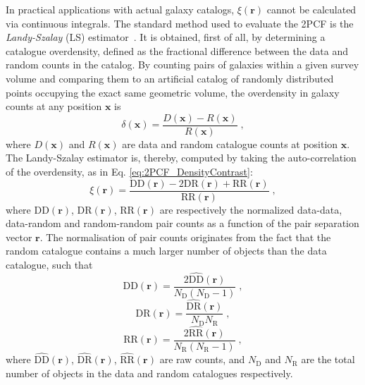 \documentclass[12pt,a4paper,oneside]{report}
\begin{document}
In practical applications with actual galaxy catalogs, $\xi(\mathbf{r})$ cannot be calculated via continuous integrals. The standard method used to evaluate the 2PCF is the \textit{Landy-Szalay} (LS) estimator~\cite{LSEstimator}. It is obtained, first of all, by determining a catalogue overdensity, defined as the fractional difference between the data and random counts in the catalog. By counting pairs of galaxies within a given survey volume and comparing them to an artificial catalog of randomly distributed points occupying the exact same geometric volume, the overdensity in galaxy counts at any position $\mathbf{x}$ is
\begin{equation}
  \delta (\mathbf{x}) = \frac{D(\mathbf{x}) - R(\mathbf{x})}{R(\mathbf{x})} \; ,
  \label{eq:LS_DensityContrast}
\end{equation}
where $D(\mathbf{x})$ and $R(\mathbf{x})$ are data and random catalogue counts at position $\mathbf{x}$. 
The Landy-Szalay estimator is, thereby, computed by taking the auto-correlation of the overdensity, as in Eq. \eqref{eq:2PCF_DensityContrast}:
\begin{equation}
  \xi (\mathbf{r}) = \frac{\mathrm{DD}(\mathbf{r}) - 2\mathrm{DR}(\mathbf{r}) + \mathrm{RR}(\mathbf{r})}{\mathrm{RR}(\mathbf{r})} \; , 
  \label{eq:LSEstimator}
\end{equation}
where $\mathrm{DD}(\mathbf{r})$, $\mathrm{DR}(\mathbf{r})$, $\mathrm{RR}(\mathbf{r})$ are respectively the normalized data-data, data-random and random-random pair counts as a function of the pair separation vector $\mathbf{r}$. The normalisation of pair counts originates from the fact that the random catalogue contains a much larger number of objects than the data catalogue, such that
\begin{equation}
  \mathrm{DD}(\mathbf{r}) = \frac{2 \widehat{\mathrm{DD}}(\mathbf{r})}{N_\mathrm{D} (N_\mathrm{D}-1)} \; ,
  \label{eq:DD}
\end{equation}
\begin{equation}
  \mathrm{DR}(\mathbf{r}) = \frac{\widehat{\mathrm{DR}}(\mathbf{r})}{N_\mathrm{D} N_\mathrm{R}} \; ,
  \label{eq:DR}
\end{equation}
\begin{equation}
  \mathrm{RR}(\mathbf{r}) = \frac{2 \widehat{\mathrm{RR}}(\mathbf{r})}{N_\mathrm{R} (N_\mathrm{R}-1)} \; ,
  \label{eq:RR}
\end{equation}
where $\widehat{\mathrm{DD}}(\mathbf{r})$, $\widehat{\mathrm{DR}}(\mathbf{r})$, $\widehat{\mathrm{RR}}(\mathbf{r})$ are raw counts, and $N_\mathrm{D}$ and $N_\mathrm{R}$ are the total number of objects in the data and random catalogues respectively.
\end{document}
